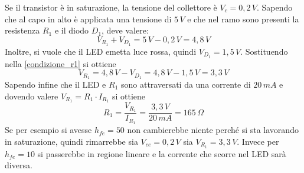 \documentclass[12pt, a4paper]{report}
\begin{document}
\begin{appendices}
\begin{enumerate}
    Se il transistor è in saturazione, la tensione del collettore è $V_{c} = 0,2\,V$. Sapendo che al capo in alto è applicata una tensione di $5\,V$ e che nel ramo sono presenti la resistenza $R_1$ e il diodo $D_1$, deve valere:
    \begin{equation}
        V_{R_1} + V_{D_1} = 5\,V - 0,2\,V = 4,8\,V
        \label{condizione_r1}
    \end{equation}
    Inoltre, si vuole che il LED emetta luce rossa, quindi $V_{D_1} = 1,5\,V$. Sostituendo nella \eqref{condizione_r1} si ottiene
    \begin{equation*}
        V_{R_1} = 4,8\,V - V_{D_1} = 4,8\,V - 1,5\,V = 3,3\,V
    \end{equation*}
    Sapendo infine che il LED e $R_1$ sono attraversati da una corrente di $20\,mA$ e dovendo valere $V_{R_1} = R_{1} \cdot I_{R_1}$ si ottiene
    \begin{equation*}
        R_{1} = \frac{V_{R_1}}{I_{R_1}} = \frac{3,3\,V}{20\,mA} = 165\,\Omega
    \end{equation*}
    Se per esempio si avesse $h_{fe} = 50$ non cambierebbe niente perché si sta lavorando in saturazione, quindi rimarrebbe sia $V_{ce} = 0,2\,V$ sia $V_{R_1} = 3,3\,V$. Invece per $h_{fe} = 10$ si passerebbe in regione lineare e la corrente che scorre nel LED sarà diversa.
\end{enumerate}

\end{appendices}
\end{document}

